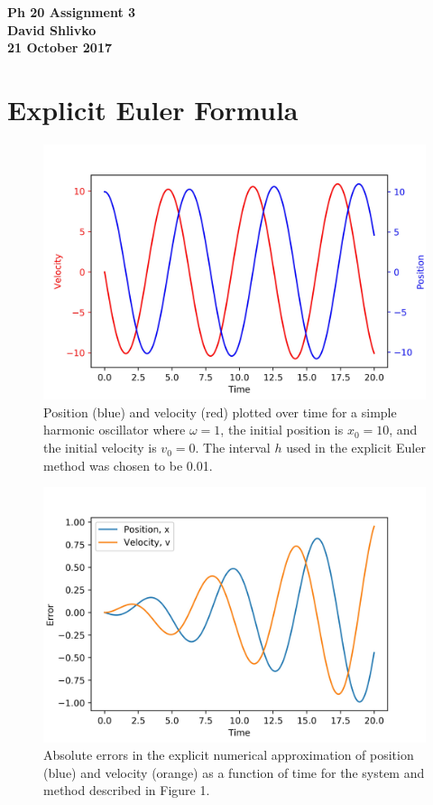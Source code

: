 \documentclass{article}
\begin{document}
\begin{center}
\textbf{\huge{Ph 20 Assignment 3}} \\
\textbf{\Large{David Shlivko}} \\
\textbf{\large{21 October 2017}}
\end{center}

\section{Explicit Euler Formula}

\begin{figure}[H]
\includegraphics[width=\textwidth]{TVP1.jpg}
\caption{Position (blue) and velocity (red) plotted over time for a simple harmonic oscillator where $\omega=1$, the initial position is $x_0 = 10$, and the initial velocity is $v_0 = 0$. The interval $h$ used in the explicit Euler method was chosen to be 0.01.}
\end{figure}

\begin{figure}[H]
\includegraphics[width=\textwidth]{TErr1.jpg}
\caption{Absolute errors in the explicit numerical approximation of position (blue) and velocity (orange) as a function of time for the system and method described in Figure 1.}
\end{figure}
\end{document}
